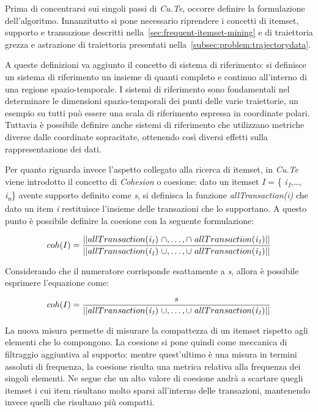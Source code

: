 Prima di concentrarsi sui singoli passi di \textit{Cu.Te}, occorre definire la formulazione dell'algoritmo.
Innanzitutto si pone necessario riprendere i concetti di itemset, supporto e transazione descritti nella~\cref{sec:frequent-itemset-mining}
e di traiettoria grezza e astrazione di traiettoria presentati nella~\cref{subsec:problem:trajectorydata}.

A queste definizioni va aggiunto il concetto di sistema di riferimento: si definisce un sistema di riferimento un insieme di
quanti completo e continuo all'interno di una regione spazio-temporale.
I sistemi di riferimento sono fondamentali nel determinare le dimensioni spazio-temporali dei punti delle varie traiettorie,
un esempio su tutti può essere una scala di riferimento espressa in coordinate polari.
Tuttavia è possibile definire anche sistemi di riferimento che utilizzano metriche diverse dalle coordinate sopracitate,
ottenendo così diversi effetti sulla rappresentazione dei dati.

Per quanto riguarda invece l'aspetto collegato alla ricerca di itemset,
in \textit{Cu.Te} viene introdotto il concetto di \textit{Cohesion} o coesione: dato un itemset \textit{I} = \{ \textit{i\textsubscript{1}},\ldots, \textit{i\textsubscript{n}}\}
avente supporto definito come \textit{s}, si definisca la funzione \textit{allTransaction(i)} %
 che dato un item \textit{i} restituisce l'insieme delle
transazioni che lo supportano. A questo punto è possibile definire la coesione con la seguente formulazione:

\[ coh(I) = \frac{\lvert \lvert allTransaction(\textit{i\textsubscript{1}})~\cap ,\ldots, \cap~allTransaction(\textit{i\textsubscript{1}}) \rvert\rvert}{\lvert \lvert allTransaction(\textit{i\textsubscript{1}})~\cup ,\ldots, \cup~allTransaction(\textit{i\textsubscript{1}}) \rvert\rvert} \]

Considerando che il numeratore corrisponde esattamente a \textit{s}, allora è possibile esprimere l'equazione come:

\[ coh(I) = \frac{s}{\lvert \lvert allTransaction(\textit{i\textsubscript{1}})~\cup ,\ldots, \cup~allTransaction(\textit{i\textsubscript{1}}) \rvert\rvert} \]

La nuova misura permette di misurare la compattezza di un itemset rispetto agli elementi che lo compongono.
La coesione si pone quindi come meccanica di filtraggio aggiuntiva al supporto:
mentre quest'ultimo è una misura in termini assoluti di frequenza, la coesione risulta una metrica relativa alla frequenza dei singoli elementi.
Ne segue che un alto valore di coesione andrà a scartare quegli itemset i cui item risultano molto sparsi all'interno delle transazioni,
mantenendo invece quelli che risultano più compatti.

